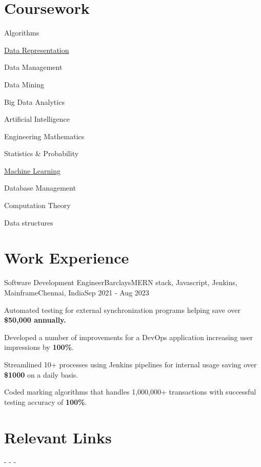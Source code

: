\documentclass[letterpaper]{resume_config}
\begin{document}
\section{Coursework}
\begin{SkillsList}{
    \item{Algorithms}
    \item{\href{https://coursera.org/share/60e08a9390dc0ed469da34213f7a9d9c}{Data Representation}}
    \item{Data Management}
    \item{Data Mining}
    \item{Big Data Analytics}
    \item{Artificial Intelligence}
    \item{Engineering Mathematics}
    \item{Statistics \& Probability}
    \item{\href{https://coursera.org/share/b76edb1c16934e4a06f3553c2c4e67b8}{Machine Learning}}
    \item{Database Management}
    \item{Computation Theory}
    \item{Data structures}
}
\end{SkillsList}



\section{Work Experience}

\WorkExperience
    {Software Development Engineer}{Barclays}{MERN stack, Javascript, Jenkins, Mainframe}{Chennai, India}{Sep 2021 - Aug 2023}
    {
        \item {Automated testing for external synchronization programs helping save over \textbf{\$50,000 annually.}}
        \item {Developed a number of improvements for a DevOps application increasing user impressions by \textbf{100\%}.} 
        \item {Streamlined 10+ processes using Jenkins pipelines for internal usage saving over \textbf{\$1000} on a daily basis.}
        \item {Coded marking algorithms that handles 1,000,000+ transactions with successful testing accuracy of \textbf{100\%}.}
    }

\section{Relevant Links}
-  
-  
- 
\end{document}
